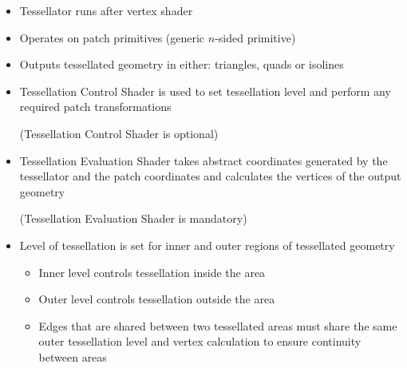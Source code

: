 \documentclass[a4paper]{article}
\begin{document}
\begin{itemize}
  \item
    Tessellator runs after vertex shader

  \item
    Operates on patch primitives (generic $n$-sided primitive)

  \item
    Outputs tessellated geometry in either: triangles, quads or isolines

  \item
    Tessellation Control Shader is used to set tessellation level and perform
    any required patch transformations

    (Tessellation Control Shader is optional)

  \item
    Tessellation Evaluation Shader takes abstract coordinates generated by the
    tessellator and the patch coordinates and calculates the vertices of the
    output geometry

    (Tessellation Evaluation Shader is mandatory)

  \item
    Level of tessellation is set for inner and outer regions of tessellated
    geometry

    \begin{itemize}
      \item
        Inner level controls tessellation inside the area

      \item
        Outer level controls tessellation outside the area

      \item
        Edges that are shared between two tessellated areas must share the same
        outer tessellation level and vertex calculation to ensure continuity
        between areas
    \end{itemize}

\end{itemize}
\end{document}
